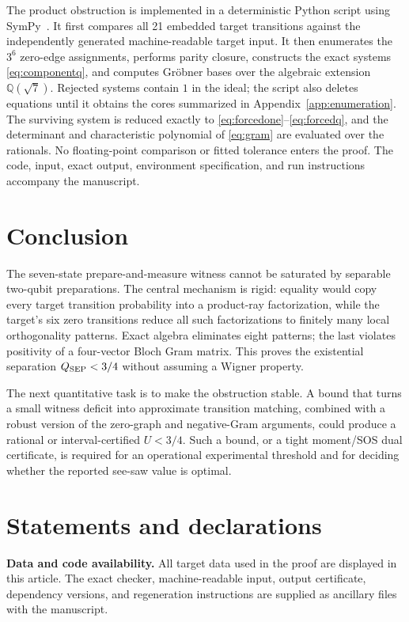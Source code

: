 \documentclass[11pt]{article}
\begin{document}
The product obstruction is implemented in a deterministic Python script using
SymPy~\cite{Meurer2017}.  It first compares all 21 embedded target transitions
against the independently generated machine-readable target input.  It then
enumerates the $3^6$ zero-edge assignments, performs parity closure, constructs
the exact systems \eqref{eq:componentq}, and computes Gr\"obner bases over the
algebraic extension $\mathbb Q(\sqrt7)$.  Rejected systems contain $1$ in the
ideal; the script also deletes equations until it obtains the cores summarized
in Appendix~\ref{app:enumeration}.  The surviving system is reduced exactly to
\eqref{eq:forcedone}--\eqref{eq:forcedq}, and the determinant and characteristic
polynomial of \eqref{eq:gram} are evaluated over the rationals.  No
floating-point comparison or fitted tolerance enters the proof.  The code,
input, exact output, environment specification, and run instructions accompany
the manuscript.

\section{Conclusion}

The seven-state prepare-and-measure witness cannot be saturated by separable
two-qubit preparations.  The central mechanism is rigid: equality would copy
every target transition probability into a product-ray factorization, while
the target's six zero transitions reduce all such factorizations to finitely
many local orthogonality patterns.  Exact algebra eliminates eight patterns;
the last violates positivity of a four-vector Bloch Gram matrix.  This proves
the existential separation $Q_{\rm SEP}<3/4$ without assuming a Wigner
property.

The next quantitative task is to make the obstruction stable.  A bound that
turns a small witness deficit into approximate transition matching, combined
with a robust version of the zero-graph and negative-Gram arguments, could
produce a rational or interval-certified $U<3/4$.  Such a bound, or a tight
moment/SOS dual certificate, is required for an operational experimental
threshold and for deciding whether the reported see-saw value is optimal.

\section*{Statements and declarations}

\noindent\textbf{Data and code availability.}
All target data used in the proof are displayed in this article.  The exact
checker, machine-readable input, output certificate, dependency versions, and
regeneration instructions are supplied as ancillary files with the manuscript.
\end{document}
